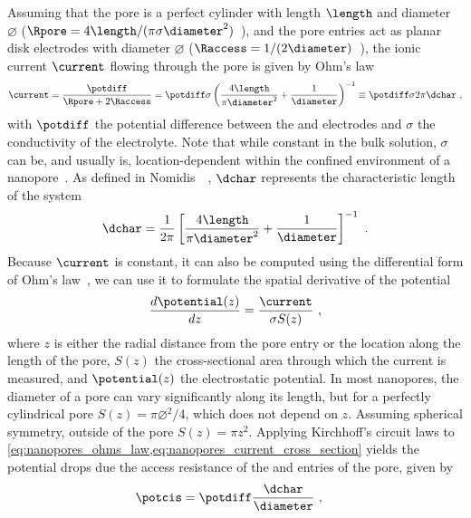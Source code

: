 Assuming that the pore is a perfect cylinder with length $\length$ and diameter $\diameter$ ($\Rpore = 4
\length / (\pi \sigma \diameter^2)$~\cite{Grosberg-2010}), and the pore entries act as planar disk electrodes
with diameter $\diameter$ ($\Raccess = 1 / (2\diameter)$~\cite{Hall-1975}), the ionic current $\current$
flowing through the pore is given by Ohm's law~\cite{Kowalczyk-2011}
%
\begin{equation}\label{eq:nanopores_ohms_law}
  \current = \dfrac{\potdiff}{\Rpore + 2 \Raccess} 
           = \potdiff \sigma \left( \dfrac{4 \length}{\pi \diameter^2} + \dfrac{1}{\diameter} \right)^{-1}
           \equiv \potdiff \sigma 2 \pi \dchar
  \text{ ,}
\end{equation}
%
with $\potdiff$ the potential difference between the \cisi{} and \transi{} electrodes and $\sigma$ the
conductivity of the electrolyte. Note that while constant in the bulk solution, $\sigma$ can be, and usually
is, location-dependent within the confined environment of a nanopore~\cite{Chinappi-2015}. As defined in
Nomidis~\etal{}~\cite{Nomidis-2018}, $\dchar$ represents the characteristic length of the system
%
\begin{equation}\label{eq:nanopores_characteristic_length}
  \dchar = \dfrac{1}{2\pi} \left[\dfrac{4 \length}{\pi\diameter^2} + \dfrac{1}{\diameter} \right]^{-1}
  \text{ .}
\end{equation}
%
Because $\current$ is constant, it can also be computed using the differential form of Ohm's
law~\cite{Chinappi-2015}, we can use it to formulate the spatial derivative of the potential
%
\begin{equation}\label{eq:nanopores_current_cross_section}
  \dfrac{d \potential(z)}{dz} = \dfrac{\current}{\sigma S(z)}
  \text{ ,}
\end{equation}
%
where $z$ is either the radial distance from the pore entry or the location along the length of the pore,
$S(z)$ the cross-sectional area through which the current is measured, and $\potential(z)$ the electrostatic
potential. In most nanopores, the diameter of a pore can vary significantly along its length, but for a
perfectly cylindrical pore $S(z) = \pi \diameter^2 / 4$, which does not depend on $z$. Assuming spherical
symmetry, outside of the pore $S(z) = \pi z^2$. Applying Kirchhoff's circuit laws to
\cref{eq:nanopores_ohms_law,eq:nanopores_current_cross_section} yields the potential drops due the access
resistance of the \cisi{} and \transi{} entries of the pore, given by
%
\begin{align}\label{eq:nanopores_potcis}
  \potcis   ={}& \potdiff \dfrac{\dchar}{\diameter}
  \text{ ,}
\end{align}
